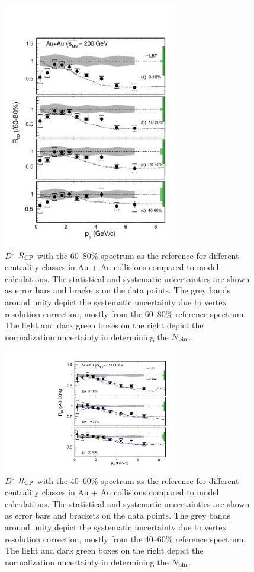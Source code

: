 \begin{figure}
\centering
\includegraphics[width=0.68\textwidth]{figure/Run14_D0HFT/D0_Rcp11.pdf}
\caption{$D^{0}$ $R_{\rm CP}$ with the 60--80\% spectrum as the reference for different centrality classes in Au + Au collisions compared to model calculations. The statistical and systematic uncertainties are shown as error bars and brackets on the data points. The grey bands around unity depict the systematic uncertainty due to vertex resolution correction, mostly from the 60--80\% reference spectrum. The light and dark green boxes on the right depict the normalization uncertainty in determining the $N_{\rm bin}$.}
\label{D0_Rcp11} 
\end{figure}

\begin{figure}
\centering
\includegraphics[width=0.68\textwidth]{figure/Run14_D0HFT/D0_Rcp22.pdf}
\caption{$D^{0}$ $R_{\rm CP}$ with the 40--60\% spectrum as the reference for different centrality classes in Au + Au collisions compared to model calculations. The statistical and systematic uncertainties are shown as error bars and brackets on the data points. The grey bands around unity depict the systematic uncertainty due to vertex resolution correction, mostly from the 40--60\% reference spectrum. The light and dark green boxes on the right depict the normalization uncertainty in determining the $N_{\rm bin}$.}
\label{D0_Rcp22} 
\end{figure}

